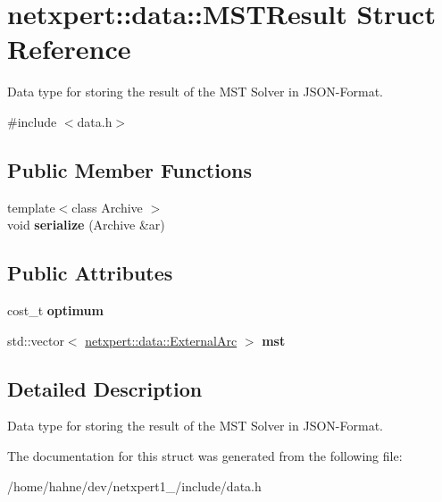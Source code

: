 \hypertarget{structnetxpert_1_1data_1_1MSTResult}{}\section{netxpert\+:\+:data\+:\+:M\+S\+T\+Result Struct Reference}
\label{structnetxpert_1_1data_1_1MSTResult}


Data type for storing the result of the M\+ST Solver in J\+S\+O\+N-\/\+Format.  




{\ttfamily \#include $<$data.\+h$>$}

\subsection*{Public Member Functions}
\begin{DoxyCompactItemize}
\item 
{\footnotesize template$<$class Archive $>$ }\\void {\bfseries serialize} (Archive \&ar)\hypertarget{structnetxpert_1_1data_1_1MSTResult_aca4fd1b2be387fb7168fbf6c0b64ba9f}{}\label{structnetxpert_1_1data_1_1MSTResult_aca4fd1b2be387fb7168fbf6c0b64ba9f}

\end{DoxyCompactItemize}
\subsection*{Public Attributes}
\begin{DoxyCompactItemize}
\item 
cost\+\_\+t {\bfseries optimum}\hypertarget{structnetxpert_1_1data_1_1MSTResult_a7e5e35232f019e1652656be9053b0b3c}{}\label{structnetxpert_1_1data_1_1MSTResult_a7e5e35232f019e1652656be9053b0b3c}

\item 
std\+::vector$<$ \hyperlink{structnetxpert_1_1data_1_1ExternalArc}{netxpert\+::data\+::\+External\+Arc} $>$ {\bfseries mst}\hypertarget{structnetxpert_1_1data_1_1MSTResult_adc2b8fc5a9581dff5f5aa63148248681}{}\label{structnetxpert_1_1data_1_1MSTResult_adc2b8fc5a9581dff5f5aa63148248681}

\end{DoxyCompactItemize}


\subsection{Detailed Description}
Data type for storing the result of the M\+ST Solver in J\+S\+O\+N-\/\+Format. 

The documentation for this struct was generated from the following file\+:\begin{DoxyCompactItemize}
\item 
/home/hahne/dev/netxpert1\+\_/include/data.\+h\end{DoxyCompactItemize}
